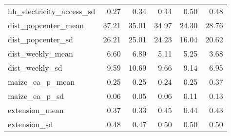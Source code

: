 \begin{table}[ht]
\begin{tabular}{lrrrrr}
  hh_electricity_access_sd & 0.27 & 0.34 & 0.44 & 0.50 & 0.48 \\ 
  dist_popcenter_mean & 37.21 & 35.01 & 34.97 & 24.30 & 28.76 \\ 
  dist_popcenter_sd & 26.21 & 25.01 & 24.23 & 16.04 & 20.62 \\ 
  dist_weekly_mean & 6.60 & 6.89 & 5.11 & 5.25 & 3.68 \\ 
  dist_weekly_sd & 9.59 & 10.69 & 9.66 & 9.14 & 6.95 \\ 
  maize_ea_p_mean & 0.25 & 0.25 & 0.24 & 0.25 & 0.37 \\ 
  maize_ea_p_sd & 0.06 & 0.05 & 0.06 & 0.11 & 0.13 \\ 
  extension_mean & 0.37 & 0.33 & 0.45 & 0.44 & 0.43 \\ 
  extension_sd & 0.48 & 0.47 & 0.50 & 0.50 & 0.50 \\ 
   \hline
\end{tabular}
\end{table}
